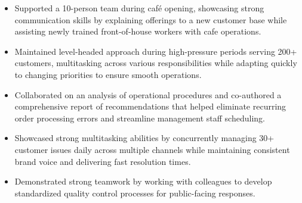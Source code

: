\documentclass[10pt,a4paper,ragged2e,withhyper]{altacv}
\begin{document}
            \vspace{-0.5em}
            \begin{itemize}
            \item Supported a 10-person team during café opening, showcasing strong communication skills by explaining offerings to a new customer base while assisting newly trained front-of-house workers with cafe operations. 
            \item Maintained level-headed approach during high-pressure periods serving 200+ customers, multitasking across various responsibilities while adapting quickly to changing priorities to ensure smooth operations.
            \item Collaborated on an analysis of operational procedures and co-authored a comprehensive report of recommendations that helped eliminate recurring order processing errors and streamline management staff scheduling.
            \end{itemize}
            \vspace{-0.5em}
            \divider
            \vspace{0.5em}
            \vspace{-0.5em}
            \begin{itemize}
            \item Showcased strong multitasking abilities by concurrently managing 30+ customer issues daily across multiple channels while maintaining consistent brand voice and delivering fast resolution times.
            \item Demonstrated strong teamwork by working with colleagues to develop standardized quality control processes for public-facing responses.
            \end{itemize}

        \vspace{-1em}
\end{document}
